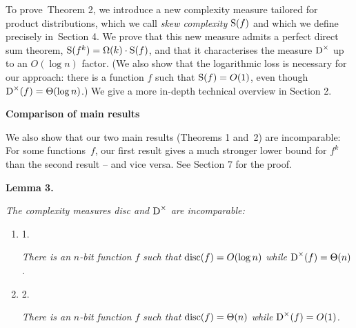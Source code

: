 To prove Theorem 2, we introduce a new complexity measure tailored for product distributions, which we call \emph{skew complexity} ${\textup{S}}(f)$ and which we define precisely in Section 4. We prove that this new measure admits a perfect direct sum theorem, ${\textup{S}}(f^{k})=\Omega(k)\cdot{\textup{S}}(f)$, and that it characterises the measure ${\textup{D}}^{\times}$ up to an $O(\log n)$ factor. (We also show that the logarithmic loss is necessary for our approach: there is a function $f$ such that ${\textup{S}}(f)=O(1)$, even though ${\textup{D}}^{\times}(f)=\Theta(\log n)$.) We give a more in-depth technical overview in Section 2.\par




\par\medskip\noindent\textbf{Comparison of main results}\par




We also show that our two main results (Theorems 1 and 2) are incomparable: For some functions $f$, our first result gives a much stronger lower bound for $f^{k}$ than the second result – and vice versa. See Section 7 for the proof.\par





\par\medskip\noindent\textbf{
\textbf{Lemma 3}\textbf{.}
}\par



\emph{The complexity measures disc and ${\textup{D}}^{\times}$ are incomparable:}\par


\begin{enumerate}


\item[] 
1. 


\emph{There is an }$n$\emph{-bit function }$f$\emph{ such that }${\textup{disc}}(f)=O(\log n)$\emph{ while }${\textup{D}}^{\times}(f)=\Theta(n)$\emph{.}\par





\item[] 
2. 


\emph{There is an }$n$\emph{-bit function }$f$\emph{ such that }${\textup{disc}}(f)=\Theta(n)$\emph{ while }${\textup{D}}^{\times}(f)=O(1)$\emph{.}\par





\end{enumerate}



